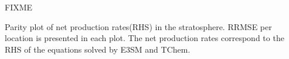 \documentclass[report, 12pt]{SANDreport}
\begin{document}
FIXME

Parity plot of net production rates(RHS) in the stratosphere. RRMSE per location is presented in each plot. The net production rates correspond to the RHS of the equations solved by E3SM and TChem.



%   

%   
%  
%   



    \nocite{*}

    \clearpage

    \providecommand*{\phantomsection}{}
    \phantomsection
    
    






        
    
    
    
\end{document}
